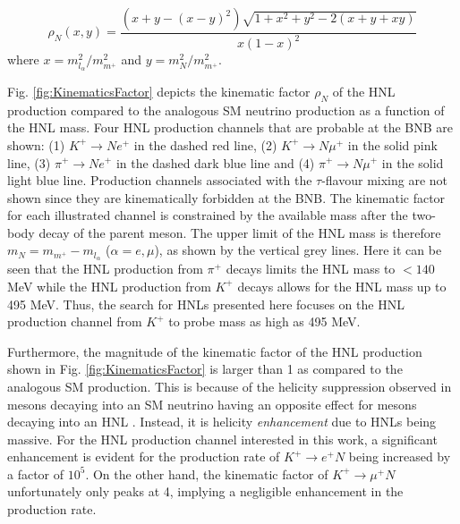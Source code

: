 \begin{equation}
	\rho_{N}(x,y) = \frac{(x+y-(x-y)^{2})\sqrt{1+x^{2}+y^{2}-2(x+y+xy)}}{x(1-x)^{2}}
\label{eq:KinematicsFactor}
\end{equation}
where $x = m^{2}_{l_{\alpha}}/m^{2}_{m^+}$ and $y=m^{2}_{N}/m^{2}_{m^+}$.

Fig. \ref{fig:KinematicsFactor} depicts the kinematic factor $\rho_N$ of the HNL production compared to the analogous SM neutrino production as a function of the HNL mass.
Four HNL production channels that are probable at the BNB are shown: (1) $K^+ \rightarrow Ne^+$ in the dashed red line, (2) $K^+ \rightarrow N\mu^+$ in the solid pink line, (3) $\pi^+ \rightarrow Ne^
+$ in the dashed dark blue line and (4) $\pi^+ \rightarrow N\mu^+$ in the solid light blue line.  
Production channels associated with the $\tau$-flavour mixing are not shown since they are kinematically forbidden at the BNB.
The kinematic factor for each illustrated channel is constrained by the available mass after the two-body decay of the parent meson.
The upper limit of the HNL mass is therefore $m_{N} = m_{m^+} - m_{l_{\alpha}}$ ($\alpha=e,\mu$), as shown by the vertical grey lines.
Here it can be seen that the HNL production from $\pi^+$ decays limits the HNL mass to $< 140$ MeV while the HNL production from $K^+$ decays allows for the HNL mass up to 495 MeV. 
Thus, the search for HNLs presented here focuses on the HNL production channel from $K^+$ to probe mass as high as 495 MeV.



Furthermore, the magnitude of the kinematic factor of the HNL production shown in Fig. \ref{fig:KinematicsFactor} is larger than 1 as compared to the analogous SM production.
This is because of the helicity suppression observed in mesons decaying into an SM neutrino having an opposite effect for mesons decaying into an HNL \cite{HNLKelly}.
Instead, it is helicity \textit{enhancement} due to HNLs being massive.
For the HNL production channel interested in this work, a significant enhancement is evident for the production rate of $K^+\rightarrow e^+ N$ being increased by a factor of $10^{5}$.
On the other hand, the kinematic factor of $K^+ \rightarrow \mu^+ N$ unfortunately only peaks at 4, implying a negligible enhancement in the production rate.


